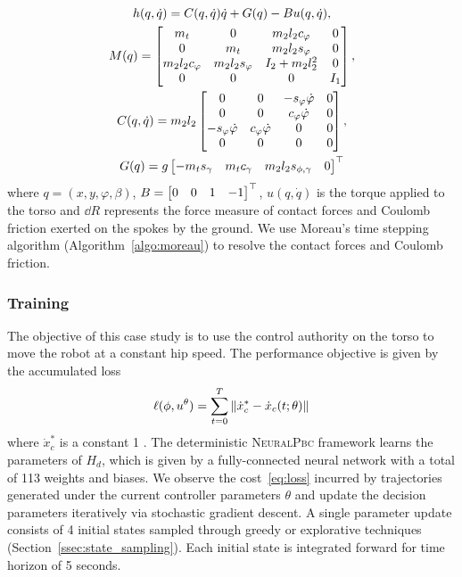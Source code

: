 \begin{equation*}
  \begin{gathered}
    h(q, \dot{q}) = C(q, \dot{q})\dot{q} + G(q) - Bu(q, \dot{q}),\\
    M(q) = \begin{bmatrix}m_t & 0 & m_2 l_2 c_{\varphi} & 0 \\ 0 & m_t & m_2 l_2 s_{\varphi} & 0 \\
            m_2 l_2 c_{\varphi} & m_2 l_2 s_{\varphi} & I_2+m_2 l_2^2 & 0 \\
            0 & 0 & 0 & I_1\end{bmatrix}, \\
    C(q,\dot{q}) = m_2l_2 \begin{bmatrix}0 & 0 & -s_{\varphi} \dot{\varphi} & 0\\ 
                    0 & 0 & c_{\varphi} \dot{\varphi} & 0 \\ 
                    -s_{\varphi} \dot{\varphi} & c_{\varphi} \dot{\varphi} & 0 & 0 \\
                    0 & 0 & 0 & 0\end{bmatrix}, \\
    G(q) = g\begin{bmatrix}-m_t s_{\gamma} & 
                  m_t c_{\gamma} &
                  m_2 l_2 s_{\phi,\gamma} &
                  0\end{bmatrix}^\top \\
  \end{gathered}
\end{equation*}
\noindent where $q = (x, y, \varphi, \beta)$, $B = \begin{bmatrix}0 & 0 & 1 & -1\end{bmatrix}^\top$,
$u(q, \dot{q})$ is the torque applied to the torso and $\dd R$ represents the
force measure of contact forces and Coulomb friction exerted on the spokes by
the ground. We use Moreau's time stepping algorithm
(Algorithm~\eqref{algo:moreau}) to resolve the contact forces and Coulomb
friction.


\subsubsection{Training}
\label{sssec:training}

The objective of this case study is to use the control authority on the torso to
move the robot at a constant hip speed.
%
The performance objective is given by the accumulated loss
\begin{align}
    \ell(\phi, u^\theta) = \sum_{t=0}^{T} \|{\dot{x}_c^* - \dot{x}_c(t; \theta)}\|_{{}_{}}
    \label{eq:loss}
\end{align}
\noindent where $\dot{x}_c^*$ is a constant 1 .
%
The deterministic \textsc{NeuralPbc} framework learns the parameters of $H_d$,
which is given by a fully-connected neural network with a total of 113 weights
and biases.   
%
We observe the cost~\eqref{eq:loss} incurred by trajectories generated under the
current controller parameters $\theta$ and update the decision parameters
iteratively via stochastic gradient descent.
%
A single parameter update consists of 4 initial states sampled
through greedy or explorative techniques (Section~\ref{ssec:state_sampling}).
%
Each initial state is integrated forward for time horizon of 5 seconds.
%

